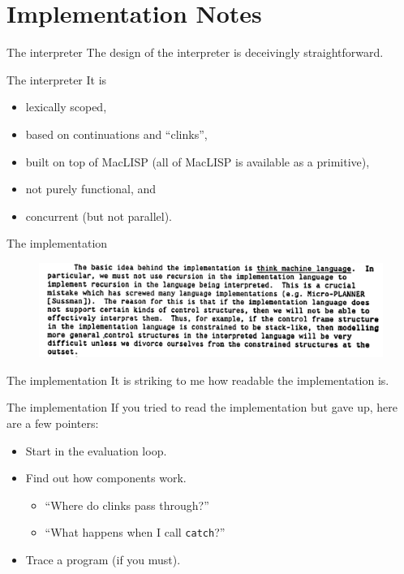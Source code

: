\documentclass[aspectratio=169]{beamer}
\begin{document}
  \section{Implementation Notes}
  \begin{frame}{The interpreter}
    The design of the interpreter is deceivingly straightforward.
  \end{frame}
  \begin{frame}{The interpreter}
    It is
    \begin{itemize}
      \item lexically scoped,
      \item based on continuations and “clinks”,
      \item built on top of MacLISP (all of MacLISP is available as a primitive),
      \item not purely functional, and
      \item concurrent (but not parallel).
    \end{itemize}
  \end{frame}
  \begin{frame}{The implementation}
    \begin{figure}
      \includegraphics[width=14cm]{implementation.png}
    \end{figure}
  \end{frame}
  \begin{frame}{The implementation}
    It is striking to me how readable the implementation is.
  \end{frame}
  \begin{frame}{The implementation}
    If you tried to read the implementation but gave up, here are a few pointers:

    \begin{itemize}
      \item Start in the evaluation loop.
      \item Find out how components work.
        \begin{itemize}
          \item “Where do clinks pass through?”
          \item “What happens when I call \texttt{catch}?”
        \end{itemize}
      \item Trace a program (if you must).
    \end{itemize}
  \end{frame}
\end{document}
